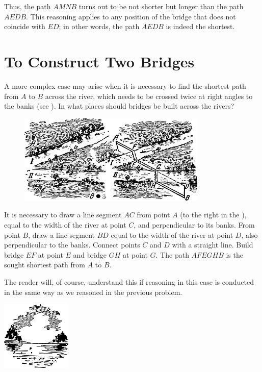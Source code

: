Thus, the path $AMNB$ turns out to be not shorter but longer than the path $AEDB$. This reasoning applies to any position of the bridge that does not coincide with $ED$; in other words, the path $AEDB$ is indeed the shortest.


\section{To Construct Two Bridges}
\label{sec-2.18}

\ques A more complex case may arise when it is necessary to find the shortest path from $A$ to $B$ across the river, which needs to be crossed twice at right angles to the banks (see ). In what places should bridges be built across the rivers?

\begin{figure}[h!]
\centering
\includegraphics[width=0.8\textwidth]{figures/ch-02/fig-060.pdf}
\end{figure}

\ans It is necessary to draw a line segment $AC$ from point $A$ (to the right in the ), equal to the width of the river at point $C$, and perpendicular to its banks. From point $B$, draw a line segment $BD$ equal to the width of the river at point $D$, also perpendicular to the banks. Connect points $C$ and $D$ with a straight line. Build bridge $EF$ at point $E$ and bridge $GH$ at point $G$. The path $AFEGHB$ is the sought shortest path from $A$ to $B$.


The reader will, of course, understand this if reasoning in this case is conducted in the same way as we reasoned in the previous problem.




\begin{center}
\includegraphics[width=0.25\textwidth]{figures/ch-02/fig-ch-02-tail.pdf}
\end{center}


















